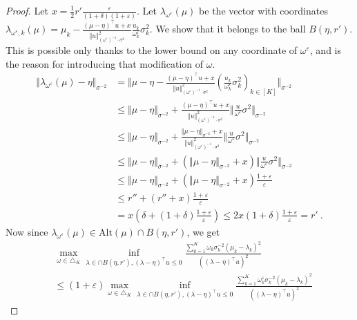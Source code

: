 \documentclass{article}
\newcommand{\alt}{\mathrm{Alt}}
\begin{document}
\begin{proof}
Let $x = \frac{1}{2}r' \frac{\varepsilon}{(1 + \delta) (1 + \varepsilon)}$. Let $\lambda_{\omega^\varepsilon}(\mu)$ be the vector with coordinates $\lambda_{\omega^\varepsilon,k}(\mu) = \mu_k - \frac{(\mu - \eta)^\top u + x}{\Vert u \Vert^2_{(\omega^\varepsilon)^{-1} \cdot \sigma^{2}}} \frac{u_k}{\omega_k^\varepsilon} \sigma_k^2$. We show that it belongs to the ball $B(\eta, r')$. This is possible only thanks to the lower bound on any coordinate of $\omega^\varepsilon$, and is the reason for introducing that modification of $\omega$.
\begin{align*}
\Vert \lambda_{\omega^\varepsilon}(\mu) - \eta \Vert_{\sigma^{-2}}
&= \Vert \mu  - \eta - \frac{(\mu - \eta)^\top u + x}{\Vert u \Vert^2_{(\omega^\varepsilon)^{-1} \cdot \sigma^{2}}} (\frac{u_k}{\omega_k^\varepsilon} \sigma_k^2)_{k\in [K]} \Vert_{\sigma^{-2}}
\\
&\le \Vert \mu - \eta \Vert_{\sigma^{-2}} + \frac{(\mu - \eta)^\top u + x}{\Vert u \Vert^2_{(\omega^\varepsilon)^{-1} \cdot \sigma^{2}}} \Vert \frac{u}{\omega^{\varepsilon}} \sigma^2 \Vert_{\sigma^{-2}}
\\
&\le \Vert \mu - \eta \Vert_{\sigma^{-2}} + \frac{\Vert \mu - \eta \Vert_{\sigma^{-2}} + x}{\Vert u \Vert^2_{(\omega^\varepsilon)^{-1} \cdot \sigma^{2}}} \Vert \frac{u}{\omega^{\varepsilon}} \sigma^2 \Vert_{\sigma^{-2}}
\\
&\le \Vert \mu - \eta \Vert_{\sigma^{-2}} + (\Vert \mu - \eta \Vert_{\sigma^{-2}} + x) \Vert \frac{u}{\omega^{\varepsilon}} \sigma^2 \Vert_{\sigma^{-2}}
\\
&\le \Vert \mu - \eta \Vert_{\sigma^{-2}} + (\Vert \mu - \eta \Vert_{\sigma^{-2}} + x)\frac{1 + \varepsilon}{\varepsilon}
\\
&\le r'' + (r'' + x)\frac{1 + \varepsilon}{\varepsilon}
\\
&= x (\delta + (1 + \delta)\frac{1 + \varepsilon}{\varepsilon})
\le 2 x(1 + \delta)\frac{1 + \varepsilon}{\varepsilon} = r'
\: .
\end{align*}
Now since $\lambda_{\omega^\varepsilon}(\mu) \in \alt(\mu) \cap B(\eta, r')$, we get
\begin{align*}
&\max_{\omega \in \triangle_K} \inf_{\lambda \in \cap B(\eta, r'), (\lambda - \eta)^\top u \le 0}
  \frac{\sum_{k=1}^K \omega_{k} \sigma_k^{-2} (\mu_k - \lambda_k)^2}{((\lambda - \eta)^\top u)^2}
\\
&\le (1 + \varepsilon) \max_{\omega \in \triangle_K} \inf_{\lambda \in \cap B(\eta, r'), (\lambda - \eta)^\top u \le 0}
  \frac{\sum_{k=1}^K \omega_{k}^\varepsilon \sigma_k^{-2} (\mu_k - \lambda_k)^2}{((\lambda - \eta)^\top u)^2}

\end{align*}
\end{proof}
\end{document}
